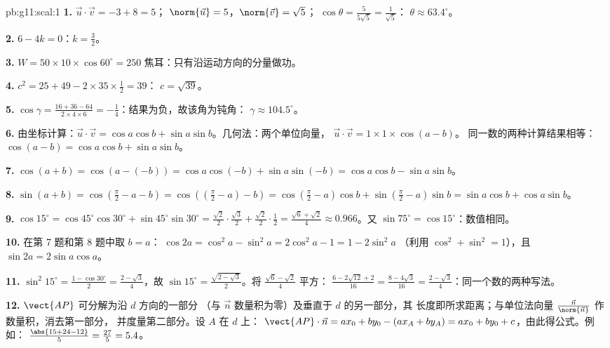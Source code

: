 \begin{solution}{pb:g11:scal:1}
\textbf{1.} $\vec u \cdot \vec v = -3 + 8 = 5$；
$\norm{\vec u} = 5$，$\norm{\vec v} = \sqrt5$；
$\cos\theta = \frac{5}{5\sqrt5} = \frac{1}{\sqrt5}$：
$\theta \approx 63.4^\circ$。

\textbf{2.} $6 - 4k = 0$：$k = \frac32$。

\textbf{3.} $W = 50 \times 10 \times \cos 60^\circ = 250$
焦耳：只有沿运动方向的分量做功。

\textbf{4.} $c^2 = 25 + 49 - 2 \times 35 \times \frac12 = 39$：
$c = \sqrt{39}$。

\textbf{5.} $\cos\gamma = \frac{16 + 36 - 64}{2 \times 4
\times 6} = -\frac14$：结果为负，故该角为钝角：
$\gamma \approx 104.5^\circ$。

\textbf{6.} 由坐标计算：$\vec u \cdot \vec v = \cos a \cos b +
\sin a \sin b$。几何法：两个单位向量，
$\vec u \cdot \vec v = 1 \times 1 \times \cos(a - b)$。
同一数的两种计算结果相等：
$\cos(a - b) = \cos a \cos b + \sin a \sin b$。

\textbf{7.} $\cos(a + b) = \cos(a - (-b)) = \cos a \cos(-b) +
\sin a \sin(-b) = \cos a \cos b - \sin a \sin b$。

\textbf{8.} $\sin(a + b) = \cos\left(\frac\pi2 - a - b\right)
= \cos\left(\left(\frac\pi2 - a\right) - b\right)
= \cos\left(\frac\pi2 - a\right)\cos b +
\sin\left(\frac\pi2 - a\right)\sin b
= \sin a \cos b + \cos a \sin b$。

\textbf{9.} $\cos 15^\circ = \cos 45^\circ \cos 30^\circ +
\sin 45^\circ \sin 30^\circ = \frac{\sqrt2}{2} \cdot
\frac{\sqrt3}{2} + \frac{\sqrt2}{2} \cdot \frac12 =
\frac{\sqrt6 + \sqrt2}{4} \approx 0.966$。又
$\sin 75^\circ = \cos 15^\circ$：数值相同。

\textbf{10.} 在第 7 题和第 8 题中取 $b = a$：
$\cos 2a = \cos^2 a - \sin^2 a = 2\cos^2 a - 1 = 1 - 2\sin^2 a$
（利用 $\cos^2 + \sin^2 = 1$），且
$\sin 2a = 2 \sin a \cos a$。

\textbf{11.} $\sin^2 15^\circ = \frac{1 - \cos 30^\circ}{2}
= \frac{2 - \sqrt3}{4}$，故
$\sin 15^\circ = \frac{\sqrt{2 - \sqrt3}}{2}$。将
$\frac{\sqrt6 - \sqrt2}{4}$ 平方：
$\frac{6 - 2\sqrt{12} + 2}{16} = \frac{8 - 4\sqrt3}{16} =
\frac{2 - \sqrt3}{4}$：同一个数的两种写法。

\textbf{12.} $\vect{AP}$ 可分解为沿 $d$ 方向的一部分
（与 $\vec n$ 数量积为零）及垂直于 $d$ 的另一部分，其
长度即所求距离；与单位法向量
$\frac{\vec n}{\norm{\vec n}}$ 作数量积，消去第一部分，
并度量第二部分。设 $A$ 在 $d$ 上：
$\vect{AP} \cdot \vec n = a x_0 + b y_0 - (a x_A + b y_A) =
a x_0 + b y_0 + c$，由此得公式。例如：
$\frac{\abs{15 + 24 - 12}}{5} = \frac{27}{5} = 5.4$。


\end{solution}
